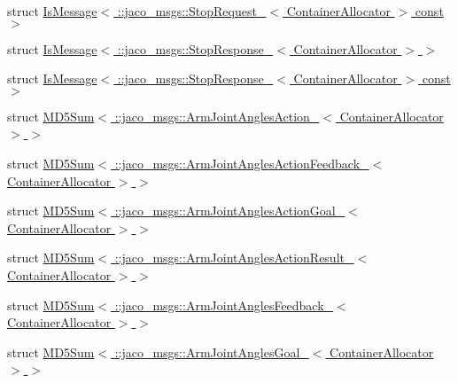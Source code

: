 \begin{DoxyCompactItemize}
\item 
struct \hyperlink{structros_1_1message__traits_1_1IsMessage_3_01_1_1jaco__msgs_1_1StopRequest___3_01ContainerAllocator_01_4_01const_01_01_4}{Is\+Message$<$ \+::jaco\+\_\+msgs\+::\+Stop\+Request\+\_\+$<$ Container\+Allocator $>$ const  $>$}
\item 
struct \hyperlink{structros_1_1message__traits_1_1IsMessage_3_01_1_1jaco__msgs_1_1StopResponse___3_01ContainerAllocator_01_4_01_4}{Is\+Message$<$ \+::jaco\+\_\+msgs\+::\+Stop\+Response\+\_\+$<$ Container\+Allocator $>$ $>$}
\item 
struct \hyperlink{structros_1_1message__traits_1_1IsMessage_3_01_1_1jaco__msgs_1_1StopResponse___3_01ContainerAllocator_01_4_01const_01_01_4}{Is\+Message$<$ \+::jaco\+\_\+msgs\+::\+Stop\+Response\+\_\+$<$ Container\+Allocator $>$ const  $>$}
\item 
struct \hyperlink{structros_1_1message__traits_1_1MD5Sum_3_01_1_1jaco__msgs_1_1ArmJointAnglesAction___3_01ContainerAllocator_01_4_01_4}{M\+D5\+Sum$<$ \+::jaco\+\_\+msgs\+::\+Arm\+Joint\+Angles\+Action\+\_\+$<$ Container\+Allocator $>$ $>$}
\item 
struct \hyperlink{structros_1_1message__traits_1_1MD5Sum_3_01_1_1jaco__msgs_1_1ArmJointAnglesActionFeedback___3_01ContainerAllocator_01_4_01_4}{M\+D5\+Sum$<$ \+::jaco\+\_\+msgs\+::\+Arm\+Joint\+Angles\+Action\+Feedback\+\_\+$<$ Container\+Allocator $>$ $>$}
\item 
struct \hyperlink{structros_1_1message__traits_1_1MD5Sum_3_01_1_1jaco__msgs_1_1ArmJointAnglesActionGoal___3_01ContainerAllocator_01_4_01_4}{M\+D5\+Sum$<$ \+::jaco\+\_\+msgs\+::\+Arm\+Joint\+Angles\+Action\+Goal\+\_\+$<$ Container\+Allocator $>$ $>$}
\item 
struct \hyperlink{structros_1_1message__traits_1_1MD5Sum_3_01_1_1jaco__msgs_1_1ArmJointAnglesActionResult___3_01ContainerAllocator_01_4_01_4}{M\+D5\+Sum$<$ \+::jaco\+\_\+msgs\+::\+Arm\+Joint\+Angles\+Action\+Result\+\_\+$<$ Container\+Allocator $>$ $>$}
\item 
struct \hyperlink{structros_1_1message__traits_1_1MD5Sum_3_01_1_1jaco__msgs_1_1ArmJointAnglesFeedback___3_01ContainerAllocator_01_4_01_4}{M\+D5\+Sum$<$ \+::jaco\+\_\+msgs\+::\+Arm\+Joint\+Angles\+Feedback\+\_\+$<$ Container\+Allocator $>$ $>$}
\item 
struct \hyperlink{structros_1_1message__traits_1_1MD5Sum_3_01_1_1jaco__msgs_1_1ArmJointAnglesGoal___3_01ContainerAllocator_01_4_01_4}{M\+D5\+Sum$<$ \+::jaco\+\_\+msgs\+::\+Arm\+Joint\+Angles\+Goal\+\_\+$<$ Container\+Allocator $>$ $>$}

\end{DoxyCompactItemize}
